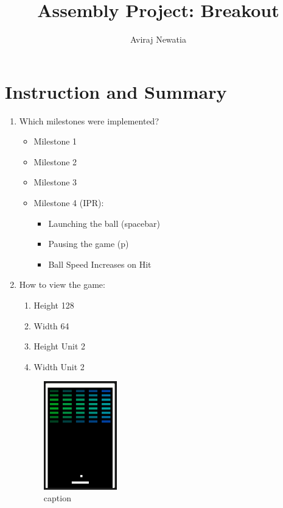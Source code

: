 \documentclass{article}
\title{Assembly Project: Breakout}
\author{Aviraj Newatia}
\begin{document}
\maketitle

\section{Instruction and Summary}

\begin{enumerate}

    \item Which milestones were implemented? 
    \begin{itemize}
    \item   Milestone 1
    \item   Milestone 2
    \item   Milestone 3
    \item   Milestone 4 (IPR):
    \begin{itemize}
        \item Launching the ball (spacebar)
        \item Pausing the game (p)
        \item Ball Speed Increases on Hit
    \end{itemize}
    \end{itemize}

    \item How to view the game:
    
    \begin{enumerate}

    \item Height 128
    \item Width 64
    \item Height Unit 2
    \item Width Unit 2


    \end{enumerate}

    

\begin{figure}[ht!]
    \centering
    \includegraphics[width=0.3\textwidth]{scene.png}
    \caption{caption}
    \label{Instructions}
\end{figure}


\end{enumerate}
\end{document}
